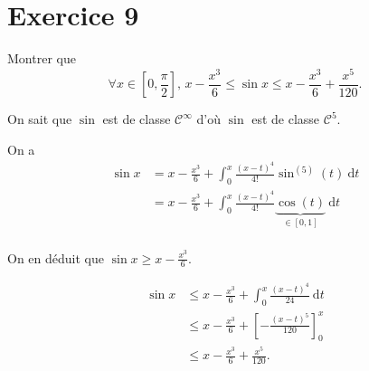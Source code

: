 \part{Exercice 9}

Montrer que \[
	\forall x \in \left[ 0,\frac{\pi}{2} \right],\, x- \frac{x^3}{6} \le \sin x \le x - \frac{x^3}{6} + \frac{x^5}{120}
.\]

On sait que $\sin$ est de classe $\mathcal{C}^{\infty}$ d'où $\sin$ est de classe $\mathcal{C}^{5}$.

On a
\begin{align*}
	\sin x &= x - \frac{x^3}{6} + \int_{0}^{x} \frac{(x-t)^4}{4!}\sin^{(5)}(t)~\mathrm{d}t\\
	&= x - \frac{x^3}{6} + \int_{0}^{x} \frac{(x-t)^4}{4!}\underbrace{\cos(t)}_{\in [0,1]}~\mathrm{d}t\\
\end{align*}

On en déduit que $\sin x \ge x - \frac{x^3}{6}$.

\begin{align*}
	\sin x &\le x - \frac{x^3}{6} + \int_{0}^{x} \frac{(x-t)^4}{24}~\mathrm{d}t\\
	&\le x - \frac{x^3}{6} + \left[ -\frac{(x-t)^5}{120} \right]_0^x\\
	&\le x - \frac{x^3}{6} + \frac{x^5}{120}.
\end{align*}


